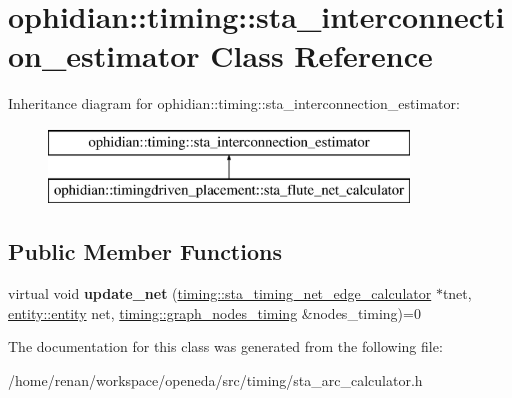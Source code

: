 \hypertarget{classophidian_1_1timing_1_1sta__interconnection__estimator}{\section{ophidian\-:\-:timing\-:\-:sta\-\_\-interconnection\-\_\-estimator Class Reference}
\label{classophidian_1_1timing_1_1sta__interconnection__estimator}
}
Inheritance diagram for ophidian\-:\-:timing\-:\-:sta\-\_\-interconnection\-\_\-estimator\-:\begin{figure}[H]
\begin{center}
\leavevmode
\includegraphics[height=2.000000cm]{classophidian_1_1timing_1_1sta__interconnection__estimator}
\end{center}
\end{figure}
\subsection*{Public Member Functions}
\begin{DoxyCompactItemize}
\item 
\hypertarget{classophidian_1_1timing_1_1sta__interconnection__estimator_abf3cff95c4f86857b96c390d09387b87}{virtual void {\bfseries update\-\_\-net} (\hyperlink{classophidian_1_1timing_1_1sta__timing__net__edge__calculator}{timing\-::sta\-\_\-timing\-\_\-net\-\_\-edge\-\_\-calculator} $\ast$tnet, \hyperlink{classophidian_1_1entity_1_1entity}{entity\-::entity} net, \hyperlink{classophidian_1_1timing_1_1graph__nodes__timing}{timing\-::graph\-\_\-nodes\-\_\-timing} \&nodes\-\_\-timing)=0}\label{classophidian_1_1timing_1_1sta__interconnection__estimator_abf3cff95c4f86857b96c390d09387b87}

\end{DoxyCompactItemize}


The documentation for this class was generated from the following file\-:\begin{DoxyCompactItemize}
\item 
/home/renan/workspace/openeda/src/timing/sta\-\_\-arc\-\_\-calculator.\-h\end{DoxyCompactItemize}
